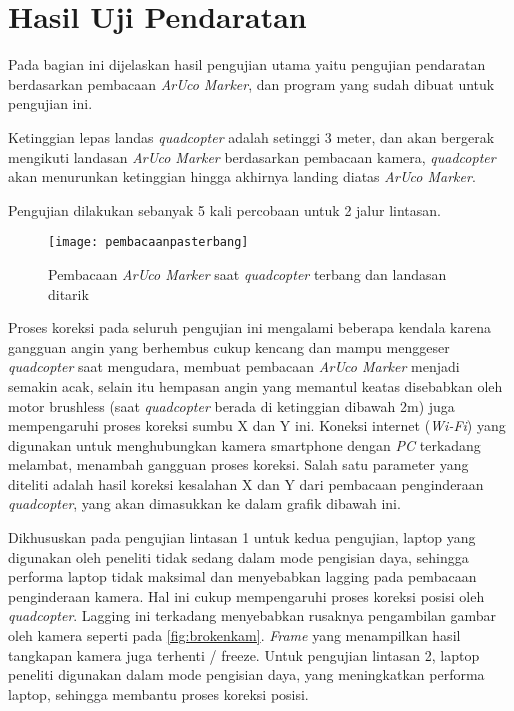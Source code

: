 \section{Hasil Uji Pendaratan}
Pada bagian ini dijelaskan hasil pengujian utama yaitu pengujian pendaratan berdasarkan pembacaan \textit{ArUco Marker}, dan program yang sudah dibuat untuk pengujian ini.

Ketinggian lepas landas \textit{quadcopter} adalah setinggi 3 meter, dan akan bergerak mengikuti landasan \textit{ArUco Marker} berdasarkan pembacaan kamera, \textit{quadcopter} akan menurunkan ketinggian hingga akhirnya landing diatas \textit{ArUco Marker}. 

Pengujian dilakukan sebanyak 5 kali percobaan untuk 2 jalur lintasan.

\begin{figure}[H]
	\centering
	\texttt{[image: pembacaanpasterbang]}
	\caption{Pembacaan \textit{ArUco Marker} saat \textit{quadcopter} terbang dan landasan ditarik}
	\label{fig:pembacaanpasterbang}
\end{figure}

Proses koreksi pada seluruh pengujian ini mengalami beberapa kendala karena gangguan angin yang berhembus cukup kencang dan mampu menggeser \textit{quadcopter} saat mengudara, membuat pembacaan \textit{ArUco Marker} menjadi semakin acak, selain itu hempasan angin yang memantul keatas disebabkan oleh motor brushless (saat \textit{quadcopter} berada di ketinggian dibawah 2m) juga mempengaruhi proses koreksi sumbu X dan Y ini. Koneksi internet (\textit{Wi-Fi}) yang digunakan untuk menghubungkan kamera smartphone dengan \textit{PC} terkadang melambat, menambah gangguan proses koreksi. Salah satu parameter yang diteliti adalah hasil koreksi kesalahan X dan Y dari pembacaan penginderaan \textit{quadcopter}, yang akan dimasukkan ke dalam grafik dibawah ini.

Dikhususkan pada pengujian lintasan 1 untuk kedua pengujian, laptop yang digunakan oleh peneliti tidak sedang dalam mode pengisian daya, sehingga performa laptop tidak maksimal dan menyebabkan lagging pada pembacaan penginderaan kamera. Hal ini cukup mempengaruhi proses koreksi posisi oleh \textit{quadcopter}. 
Lagging ini terkadang menyebabkan rusaknya pengambilan gambar oleh kamera seperti pada \cref{fig:brokenkam}. \textit{Frame} yang menampilkan hasil tangkapan kamera juga terhenti / freeze.
Untuk pengujian lintasan 2, laptop peneliti digunakan dalam mode pengisian daya, yang meningkatkan performa laptop, sehingga membantu proses koreksi posisi.

